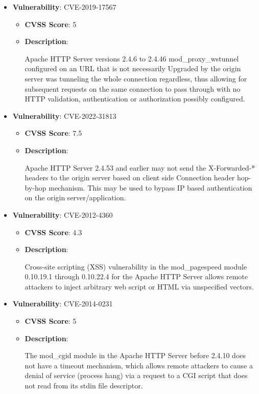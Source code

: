 \documentclass{article}
\begin{document}
\begin{itemize}
        \item \textbf{Vulnerability}: CVE-2019-17567
        \begin{itemize}
            \item \textbf{CVSS Score}:  5 
            \item \textbf{Description}:
            \parbox[t]{0.9\linewidth}{
                \ttfamily Apache HTTP Server versions 2.4.6 to 2.4.46 mod\_proxy\_wstunnel configured on an URL that is not necessarily Upgraded by the origin server was tunneling the whole connection regardless, thus allowing for subsequent requests on the same connection to pass through with no HTTP validation, authentication or authorization possibly configured.
            }
        \end{itemize}
    
        \item \textbf{Vulnerability}: CVE-2022-31813
        \begin{itemize}
            \item \textbf{CVSS Score}:  7.5 
            \item \textbf{Description}:
            \parbox[t]{0.9\linewidth}{
                \ttfamily Apache HTTP Server 2.4.53 and earlier may not send the X-Forwarded-* headers to the origin server based on client side Connection header hop-by-hop mechanism. This may be used to bypass IP based authentication on the origin server/application.
            }
        \end{itemize}
    
        \item \textbf{Vulnerability}: CVE-2012-4360
        \begin{itemize}
            \item \textbf{CVSS Score}:  4.3 
            \item \textbf{Description}:
            \parbox[t]{0.9\linewidth}{
                \ttfamily Cross-site scripting (XSS) vulnerability in the mod\_pagespeed module 0.10.19.1 through 0.10.22.4 for the Apache HTTP Server allows remote attackers to inject arbitrary web script or HTML via unspecified vectors.
            }
        \end{itemize}
    
        \item \textbf{Vulnerability}: CVE-2014-0231
        \begin{itemize}
            \item \textbf{CVSS Score}:  5 
            \item \textbf{Description}:
            \parbox[t]{0.9\linewidth}{
                \ttfamily The mod\_cgid module in the Apache HTTP Server before 2.4.10 does not have a timeout mechanism, which allows remote attackers to cause a denial of service (process hang) via a request to a CGI script that does not read from its stdin file descriptor.
            }
        \end{itemize}
    

\end{itemize}
\end{document}
